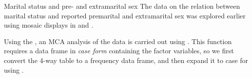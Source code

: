 \documentclass[11pt]{book}
\renewenvironment{knitrout}{\small\renewcommand{\baselinestretch}{.85}}{} %
\begin{document}
\begin{Example}[marital3]{Marital status and pre- and extramarital sex}
The data on the relation between marital status and reported
premarital and extramarital sex was explored earlier using mosaic
displays in  and .

Using the , an MCA analysis of the  data is carried out
using .  
This function requires a data frame in \emph{case form}
containing the factor variables, so we first convert the 4-way
 table to a frequency data frame, and then expand it
to case for using .
\begin{knitrout}
\color{fgcolor}\begin{kframe}
\begin{alltt}
\hlstd{(}\hlstd{,} \hlstd{=}\hlstd{)}
 \hlkwb{<-}  \hlopt{:}\hlstd{)}   
 \hlkwb{<-} \hlstd{(}
\end{alltt}
\end{kframe}
\end{knitrout}


\end{Example}
\end{document}
